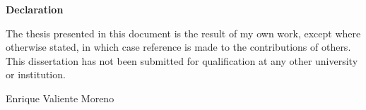 \begin{center}
    {\bfseries\Large Declaration}\par
    \vspace{0.8cm}
    \end{center}
    

    The thesis presented in this document is the result of my own work, except where otherwise stated, in which case reference is made to the contributions of others. This dissertation has not been submitted for qualification at any other university or institution.



    \begin{flushright}
        Enrique Valiente Moreno
    \end{flushright}
